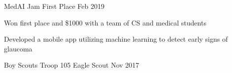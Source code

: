 
\begin{cventries}
  \cventry
    {MedAI Jam} %
    {First Place} %
    {} %
    {Feb 2019} %
    {
      \begin{cvitems}
        \item {Won first place and \$1000 with a team of CS and medical students}
        \item {Developed a mobile app utilizing machine learning to detect early signs of glaucoma}
      \end{cvitems}
    } %

  \cventry
    {Boy Scouts Troop 105}
    {Eagle Scout}
    {}
    {Nov 2017}
    {}

\end{cventries}
